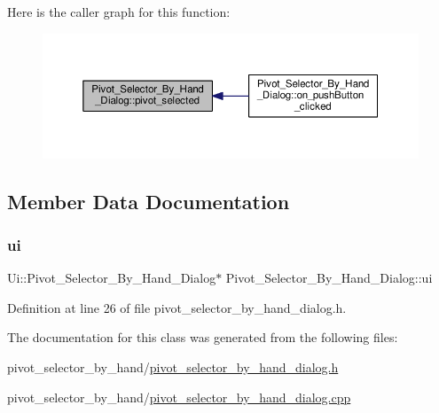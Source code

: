 Here is the caller graph for this function\+:\nopagebreak
\begin{figure}[H]
\begin{center}
\leavevmode
\includegraphics[width=350pt]{classPivot__Selector__By__Hand__Dialog_add82981678d1a1a9e13f40437b69b454_icgraph}
\end{center}
\end{figure}


\subsection{Member Data Documentation}
\mbox{\label{classPivot__Selector__By__Hand__Dialog_a0d5f15b127863ddef68e1427bc8be59e}} 
\subsubsection{\texorpdfstring{ui}{ui}}
{\footnotesize\ttfamily Ui\+::\+Pivot\+\_\+\+Selector\+\_\+\+By\+\_\+\+Hand\+\_\+\+Dialog$\ast$ Pivot\+\_\+\+Selector\+\_\+\+By\+\_\+\+Hand\+\_\+\+Dialog\+::ui\hspace{0.3cm}{\ttfamily [private]}}



Definition at line 26 of file pivot\+\_\+selector\+\_\+by\+\_\+hand\+\_\+dialog.\+h.



The documentation for this class was generated from the following files\+:\begin{DoxyCompactItemize}
\item 
pivot\+\_\+selector\+\_\+by\+\_\+hand/\hyperlink{pivot__selector__by__hand__dialog_8h}{pivot\+\_\+selector\+\_\+by\+\_\+hand\+\_\+dialog.\+h}\item 
pivot\+\_\+selector\+\_\+by\+\_\+hand/\hyperlink{pivot__selector__by__hand__dialog_8cpp}{pivot\+\_\+selector\+\_\+by\+\_\+hand\+\_\+dialog.\+cpp}\end{DoxyCompactItemize}

